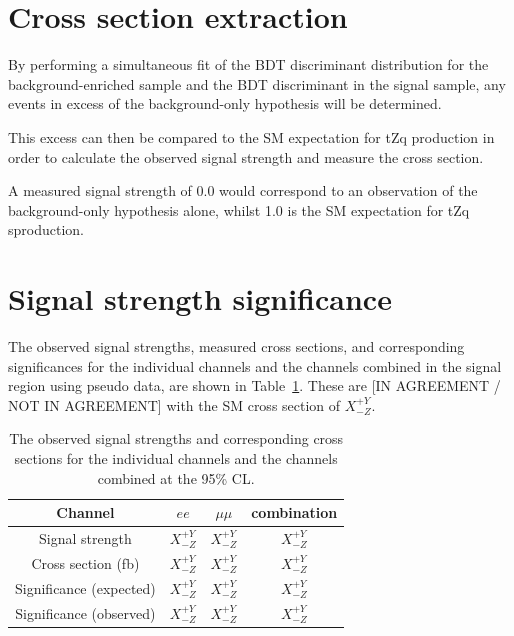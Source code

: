 \section{Cross section extraction}
By performing a simultaneous fit of the BDT discriminant distribution for the background-enriched sample and the BDT discriminant in the signal sample, any events in excess of the background-only hypothesis will be determined.

This excess can then be compared to the SM expectation for tZq production in order to calculate the observed signal strength and measure the cross section.

A measured signal strength of 0.0 would correspond to an observation of the background-only hypothesis alone, whilst 1.0 is the SM expectation for tZq sproduction.

\section{Signal strength significance}
The observed signal strengths, measured cross sections, and corresponding significances for the individual channels and the channels combined in the signal region using pseudo data, are shown in Table~\ref{tab:shapetxs}. 
These are [IN AGREEMENT / NOT IN AGREEMENT] with the SM cross section of  $X^{+Y}_{-Z}$.
 
\begin{table}[!h]
   \centering
   \caption{The observed signal strengths and corresponding cross sections for
   the individual channels and the channels combined at the 95\% CL.}
   \begin{tabular}{cccc}
       \hline
       Channel & $ee$ & $\mu\mu$ & \textbf{combination} \\
        \hline
        Signal strength & $X_{-Z}^{+Y}$ & $X_{-Z}^{+Y}$ & $X_{-Z}^{+Y}$ \\
       Cross section (fb) & $X_{-Z}^{+Y}$ & $X_{-Z}^{+Y}$ & $X_{-Z}^{+Y}$ \\
       Significance (expected) & $X_{-Z}^{+Y}$ & $X_{-Z}^{+Y}$ & $X_{-Z}^{+Y}$ \\
       Significance (observed) & $X_{-Z}^{+Y}$ & $X_{-Z}^{+Y}$ & $X_{-Z}^{+Y}$ \\
        \hline
    \end{tabular}
   \label{tab:shapetxs}
\end{table}


